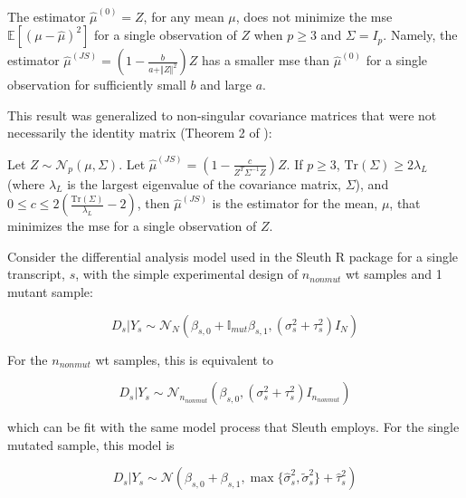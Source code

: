 \begin{theorem}
  The estimator $\hat{\mu}^{(0)} = Z$, for any mean $\mu$, does not minimize the \gls{mse} $\mathbb{E} \left[ (\mu - \hat{\mu})^2 \right]$ for a single observation of $Z$ when $p \ge 3$ and $\Sigma = I_p$. Namely, the estimator $\hat{\mu}^{(JS)} = \left( 1 - \frac{b}{a + \Vert Z \Vert ^2}\right) Z$ has a smaller \gls{mse} than $\hat{\mu}^{(0)}$ for a single observation for sufficiently small $b$ and large $a$.
\end{theorem}

This result was generalized to non-singular covariance matrices that were not necessarily the identity matrix (Theorem 2 of \cite[REF][]{bockMinimaxEstimatorsMean1975}):

\begin{theorem}
  Let $Z \sim \mathcal{N}_p \left(\mu, \Sigma \right)$.
  Let $\hat{\mu}^{(JS)} = \left( 1 - \frac{c}{Z^T \Sigma^{-1} Z}\right) Z$.
  If $p \ge 3$, $\text{Tr}(\Sigma) \ge 2 \lambda_L$ (where $\lambda_L$ is the largest eigenvalue of the covariance matrix, $\Sigma$), and $0 \le c \le 2 \left( \frac{\text{Tr}(\Sigma)}{\lambda_L} - 2 \right)$, then $\hat{\mu}^{(JS)}$ is the estimator for the mean, $\mu$, that minimizes the \gls{mse} for a single observation of $Z$.
\end{theorem}

Consider the differential analysis model used in the Sleuth R package \cite{pimentelDifferentialAnalysisRNAseq2017, yiGenelevelDifferentialAnalysis2018} for a single transcript, $s$, with the simple experimental design of $n_{nonmut}$ \gls{wt} samples and 1 mutant sample:

\begin{equation*}
  D_s | Y_s \sim \mathcal{N}_N \left( \beta_{s,0} + \mathbb{I}_{mut}\beta_{s,1}, (\sigma_s^2 + \tau_s^2)I_N \right)
\end{equation*}

For the $n_{nonmut}$ \gls{wt} samples, this is equivalent to

\begin{equation*}
  D_s | Y_s \sim \mathcal{N}_{n_{nonmut}} \left( \beta_{s,0}, (\sigma_s^2 + \tau_s^2)I_{n_{nonmut}} \right)
\end{equation*}

which can be fit with the same model process that Sleuth employs.
For the single mutated sample, this model is

\begin{equation}
  D_s | Y_s \sim \mathcal{N} \left( \beta_{s, 0} + \beta_{s, 1}, \max\{ \hat{\sigma}_s^2, \tilde{\sigma}_s^2 \} + \hat{\tau}_s^2 \right)
  \label{eqn:single_mut_model}
\end{equation}

